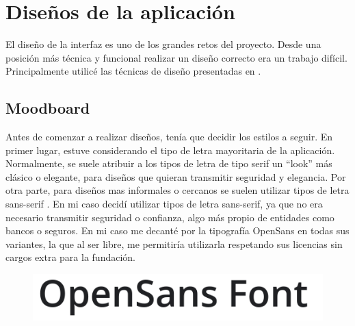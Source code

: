 \section{Diseños de la aplicación}

El diseño de la interfaz es uno de los grandes retos del proyecto. Desde una posición más técnica y funcional realizar un diseño correcto era un trabajo difícil. Principalmente utilicé las técnicas de diseño presentadas en \cite{refactoring-ui}.

\subsection{Moodboard}

Antes de comenzar a realizar diseños, tenía que decidir los estilos a seguir. En primer lugar, estuve considerando el tipo de letra mayoritaria de la aplicación. Normalmente, se suele atribuir a los tipos de letra de tipo serif un ``look'' más clásico o elegante, para diseños que quieran transmitir seguridad y elegancia. Por otra parte, para diseños mas informales o cercanos se suelen utilizar tipos de letra sans-serif \cite[p.~21]{refactoring-ui}. En mi caso decidí utilizar tipos de letra sans-serif, ya que no era necesario transmitir seguridad o confianza, algo más propio de entidades como bancos o seguros. En mi caso me decanté por la tipografía OpenSans en todas sus variantes, la que al ser libre, me permitiría utilizarla respetando sus licencias sin cargos extra para la fundación.

\begin{figure}[h!]
    \centering
    \includegraphics[width=0.9\linewidth]{diseno/app/presentacion/opensans.png}
\end{figure}

